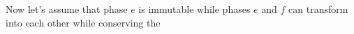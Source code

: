 Now let's assume that phase \(e\) is immutable while phases \(e\) and \(f\) can transform into each other while conserving the 